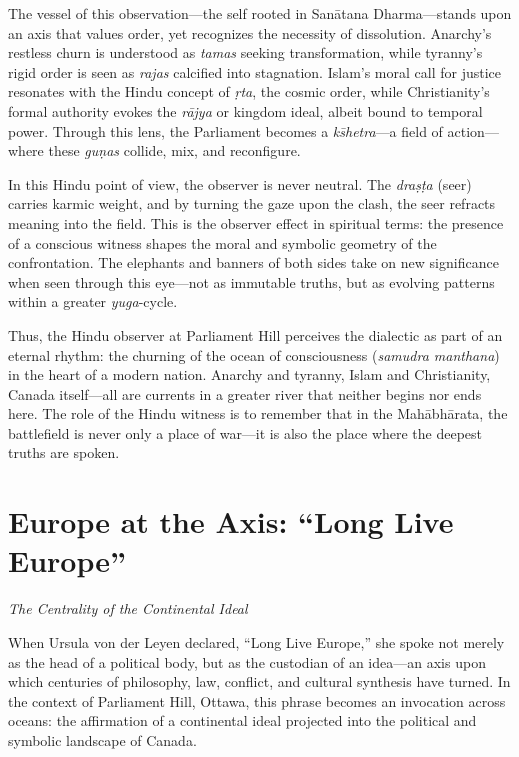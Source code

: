 \documentclass[12pt]{article}
\begin{document}
The vessel of this observation—the self rooted in San\={a}tana Dharma—stands upon an axis that values order, yet recognizes the necessity of dissolution. Anarchy’s restless churn is understood as \textit{tamas} seeking transformation, while tyranny’s rigid order is seen as \textit{rajas} calcified into stagnation. Islam’s moral call for justice resonates with the Hindu concept of \textit{\d{r}ta}, the cosmic order, while Christianity’s formal authority evokes the \textit{r\={a}jya} or kingdom ideal, albeit bound to temporal power. Through this lens, the Parliament becomes a \textit{k\=shetra}—a field of action—where these \textit{gu\d{n}as} collide, mix, and reconfigure.

In this Hindu point of view, the observer is never neutral. The \textit{dra\d{s}\d{t}a} (seer) carries karmic weight, and by turning the gaze upon the clash, the seer refracts meaning into the field. This is the observer effect in spiritual terms: the presence of a conscious witness shapes the moral and symbolic geometry of the confrontation. The elephants and banners of both sides take on new significance when seen through this eye—not as immutable truths, but as evolving patterns within a greater \textit{yuga}-cycle.

Thus, the Hindu observer at Parliament Hill perceives the dialectic as part of an eternal rhythm: the churning of the ocean of consciousness (\textit{samudra manthana}) in the heart of a modern nation. Anarchy and tyranny, Islam and Christianity, Canada itself—all are currents in a greater river that neither begins nor ends here. The role of the Hindu witness is to remember that in the Mah\={a}bh\={a}rata, the battlefield is never only a place of war—it is also the place where the deepest truths are spoken.

\newpage
\section*{Europe at the Axis: ``Long Live Europe''}
\noindent\textit{The Centrality of the Continental Ideal}

When Ursula von der Leyen declared, ``Long Live Europe,'' she spoke not merely as the head of a political body, but as the custodian of an idea—an axis upon which centuries of philosophy, law, conflict, and cultural synthesis have turned. In the context of Parliament Hill, Ottawa, this phrase becomes an invocation across oceans: the affirmation of a continental ideal projected into the political and symbolic landscape of Canada.
\end{document}
